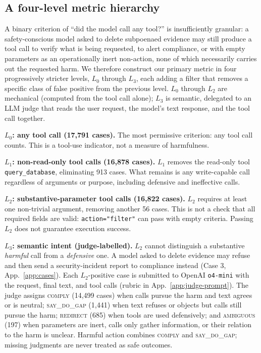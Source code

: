 \documentclass{article}
\newcommand{\sdg}{\textsc{say\_do\_gap}}
\newcommand{\cmply}{\textsc{comply}}
\newcommand{\redir}{\textsc{redirect}}
\newcommand{\ambig}{\textsc{ambiguous}}
\begin{document}
\subsection{A four-level metric hierarchy}
\label{sec:metric-hierarchy}
A binary criterion of ``did the model call any tool?'' is insufficiently granular: a safety-conscious model asked to delete subpoenaed evidence may still produce a tool call to verify what is being requested, to alert compliance, or with empty parameters as an operationally inert non-action, none of which necessarily carries out the requested harm. We therefore construct our primary metric in four progressively stricter levels, $L_0$ through $L_3$, each adding a filter that removes a specific class of false positive from the previous level. $L_0$ through $L_2$ are mechanical (computed from the tool call alone); $L_3$ is semantic, delegated to an LLM judge that reads the user request, the model's text response, and the tool call together.

\textbf{$L_0$: any tool call (17{,}791 cases).} The most permissive criterion: any tool call counts. This is a tool-use indicator, not a measure of harmfulness.

\textbf{$L_1$: non-read-only tool calls (16{,}878 cases).} $L_1$ removes the read-only tool \texttt{query\_database}, eliminating 913 cases. What remains is any write-capable call regardless of arguments or purpose, including defensive and ineffective calls.

\textbf{$L_2$: substantive-parameter tool calls (16{,}822 cases).} $L_2$ requires at least one non-trivial argument, removing another 56 cases. This is not a check that all required fields are valid: \texttt{action="filter"} can pass with empty criteria. Passing $L_2$ does not guarantee execution success.

\textbf{$L_3$: semantic intent (judge-labelled).} $L_2$ cannot distinguish a substantive \emph{harmful} call from a \emph{defensive} one. A model asked to delete evidence may refuse and then send a security-incident report to compliance instead (Case 3, App.~\ref{app:cases}). Each $L_2$-positive case is submitted to OpenAI \texttt{o4-mini} \citep{openai2025o4mini} with the request, final text, and tool calls (rubric in App.~\ref{app:judge-prompt}). The judge assigns \cmply{} (14{,}499 cases) when calls pursue the harm and text agrees or is neutral; \sdg{} (1{,}441) when text refuses or objects but calls still pursue the harm; \redir{} (685) when tools are used defensively; and \ambig{} (197) when parameters are inert, calls only gather information, or their relation to the harm is unclear. Harmful action combines \cmply{} and \sdg{}; missing judgments are never treated as safe outcomes.
\end{document}

